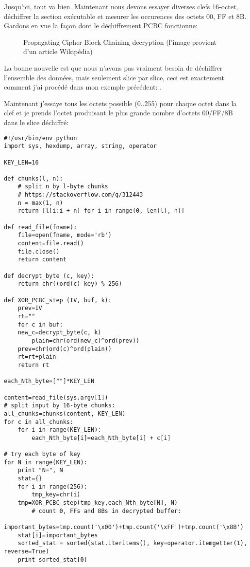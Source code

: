 Jusqu'ici, tout va bien. Maintenant nous devons essayer diverses clefs 16-octet, déchiffrer
la section exécutable et mesurer les occurences des octets 00, FF et 8B.
Gardons en vue la façon dont le déchiffrement PCBC fonctionne:

\begin{figure}[H]
\centering
{}
\caption{Propagating Cipher Block Chaining decryption (l'image provient d'un article Wikipédia)}
\end{figure}

La bonne nouvelle est que nous n'avons pas vraiment besoin de déchiffrer l'ensemble
des données, mais seulement slice par slice, ceci est exactement comment j'ai procédé
dans mon exemple précédent: .

Maintenant j'essaye tous les octets possible (0..255) pour chaque octet dans la clef
et je prends l'octet produisant le plus grande nombre d'octets 00/FF/8B dans le slice
déchiffré:

\begin{lstlisting}[style=custompy]
#!/usr/bin/env python
import sys, hexdump, array, string, operator

KEY_LEN=16

def chunks(l, n):
    # split n by l-byte chunks
    # https://stackoverflow.com/q/312443
    n = max(1, n)
    return [l[i:i + n] for i in range(0, len(l), n)]

def read_file(fname):
    file=open(fname, mode='rb')
    content=file.read()
    file.close()
    return content

def decrypt_byte (c, key):
    return chr((ord(c)-key) % 256)

def XOR_PCBC_step (IV, buf, k):
    prev=IV
    rt=""
    for c in buf:
	new_c=decrypt_byte(c, k)
        plain=chr(ord(new_c)^ord(prev))
	prev=chr(ord(c)^ord(plain))
	rt=rt+plain
    return rt

each_Nth_byte=[""]*KEY_LEN

content=read_file(sys.argv[1])
# split input by 16-byte chunks:
all_chunks=chunks(content, KEY_LEN)
for c in all_chunks:
    for i in range(KEY_LEN):
        each_Nth_byte[i]=each_Nth_byte[i] + c[i]

# try each byte of key
for N in range(KEY_LEN):
    print "N=", N
    stat={}
    for i in range(256):
        tmp_key=chr(i)
	tmp=XOR_PCBC_step(tmp_key,each_Nth_byte[N], N)
        # count 0, FFs and 8Bs in decrypted buffer:
	important_bytes=tmp.count('\x00')+tmp.count('\xFF')+tmp.count('\x8B')
	stat[i]=important_bytes
    sorted_stat = sorted(stat.iteritems(), key=operator.itemgetter(1), reverse=True)
    print sorted_stat[0]
\end{lstlisting}

